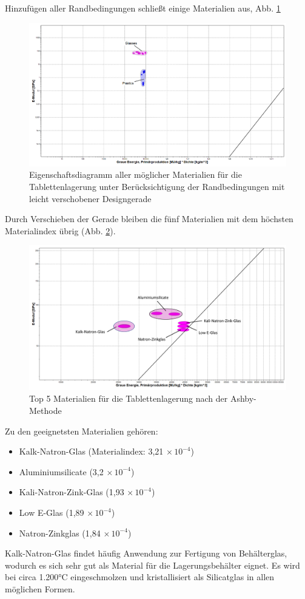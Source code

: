 Hinzufügen aller Randbedingungen schließt einige Materialien aus, Abb. \ref{fig:ces_3_3_2}\\
\begin{figure}[H]
	\centering
	\includegraphics[width=1.0\linewidth]{chapter/Bilder/3_3_2}
	\caption{Eigenschaftsdiagramm aller möglicher Materialien für die Tablettenlagerung unter Berücksichtigung der Randbedingungen mit leicht verschobener Designgerade}
	\label{fig:ces_3_3_2}
\end{figure}
Durch Verschieben der Gerade bleiben die fünf Materialien mit dem höchsten Materialindex übrig (Abb. \ref{fig:ces_3_3_3}).\\
\begin{figure}[H]
	\centering
	\includegraphics[width=1.0\linewidth]{chapter/Bilder/3_3_3}
	\caption{Top 5 Materialien für die Tablettenlagerung nach der Ashby-Methode}
	\label{fig:ces_3_3_3}
\end{figure}
Zu den geeignetsten Materialien gehören:
\begin{itemize}
	\item[1)] Kalk-Natron-Glas (Materialindex: 3,21$\,\times10^{-4}$)
	\item[2)] Aluminiumsilicate (3,2$\,\times10^{-4}$) 
	\item[3)] Kali-Natron-Zink-Glas (1,93$\,\times10^{-4}$)
	\item[4)] Low E-Glas (1,89$\,\times10^{-4}$)
	\item[5)] Natron-Zinkglas (1,84$\,\times10^{-4}$)
\end{itemize}
Kalk-Natron-Glas findet häufig Anwendung zur Fertigung von Behälterglas, wodurch es sich sehr gut als Material für die Lagerungsbehälter eignet. Es wird bei circa 1.200°C eingeschmolzen und kristallisiert als Silicatglas in allen möglichen Formen. 

